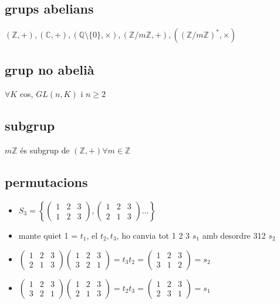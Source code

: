 \documentclass{article}
\newcommand{\Z}{\mathbb{Z}}
\newcommand{\Q}{\mathbb{Q}}
\newcommand{\C}{\mathbb{C}}
\begin{document}
\subsection{grups abelians}
$(\Z, +), (\C, +), (\Q\setminus\{0\}, \times), (\Z/m\Z, +), ((\Z/m\Z)^*, \times)$
\subsection{grup no abelià}
$\forall K$ cos, $GL(n, K)$ i $n \ge 2$
\subsection{subgrup}
$m\Z$ és subgrup de $(\Z, +) \forall m \in \Z$
\subsection{permutacions}
\begin{itemize}
\item $S_3 = \left\{\begin{pmatrix}1&2&3\\1&2&3\end{pmatrix}, \begin{pmatrix}1&2&3\\2&1&3\end{pmatrix} \dots \right\}$\\
\item mante quiet 1 = $t_1$, el $t_2, t_3$, ho canvia tot 1 2 3 $s_1$ amb desordre 312 $s_2$
\item $\begin{pmatrix}1&2&3\\2&1&3\end{pmatrix}\begin{pmatrix}1&2&3\\3&2&1\end{pmatrix} = t_3 t_2 = \begin{pmatrix}1&2&3\\3&1&2\end{pmatrix} = s_2$
\item $\begin{pmatrix}1&2&3\\3&2&1\end{pmatrix}\begin{pmatrix}1&2&3\\2&1&3\end{pmatrix} = t_2 t_3 = \begin{pmatrix}1&2&3\\2&3&1\end{pmatrix} = s_1$
\end{itemize}
\end{document}
